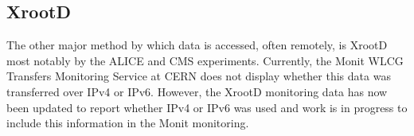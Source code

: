 \subsection{XrootD}
The other major method by which data is accessed, often remotely, is XrootD most notably by the ALICE and CMS experiments. Currently, the Monit WLCG Transfers Monitoring Service at CERN \cite{grafana-WLCG-Transfers} does not display whether this data was transferred over IPv4 or IPv6. However, the XrootD monitoring data has now been updated to report whether IPv4 or IPv6 was used \cite{xrootd-ipv6} and work is in progress to include this information in the Monit monitoring.


